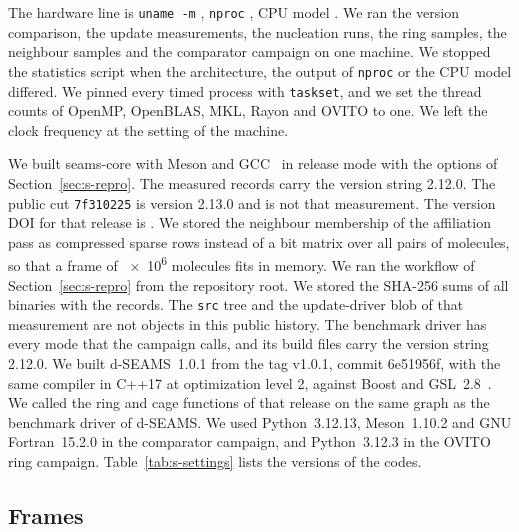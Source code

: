 \documentclass[preprint,12pt]{elsarticle}
\begin{document}
The hardware line is \texttt{uname -m} \texttt{},
\texttt{nproc} , CPU model \texttt{}.
We ran the version comparison, the update measurements, the nucleation
runs, the ring samples, the neighbour samples and the comparator
campaign on one machine.
We stopped the statistics script when the architecture, the output of
\texttt{nproc} or the CPU model differed.
We pinned every timed process with \texttt{taskset}, and we set the
thread counts of OpenMP, OpenBLAS, MKL, Rayon and OVITO to one.
We left the clock frequency at the setting of the machine.

We built seams-core with Meson and GCC~ in release mode with
the options of Section~\ref{sec:s-repro}.
The measured records carry the version string 2.12.0.
The public cut \texttt{7f310225} is version 2.13.0 and is not that measurement.
The version DOI for that release is \DOIPENDING.
We stored the neighbour membership of the affiliation pass as compressed
sparse rows instead of a bit matrix over all pairs of molecules, so that
a frame of \num{e6} molecules fits in memory.
We ran the workflow of Section~\ref{sec:s-repro} from the repository
root.
We stored the SHA-256 sums of all binaries with the records.
The \texttt{src} tree and the update-driver blob of that measurement
are not objects in this public history.
The benchmark driver has every mode that the campaign calls, and its
build files carry the version string 2.12.0.
We built d-SEAMS~1.0.1 from the tag v1.0.1, commit 6e51956f, with the
same compiler in C++17 at optimization level 2, against Boost and
GSL~2.8~\cite{dseams101}.
We called the ring and cage functions of that release on the same graph
as the benchmark driver of d-SEAMS.
We used Python~3.12.13, Meson~1.10.2 and GNU Fortran~15.2.0 in the
comparator campaign, and Python~3.12.3 in the OVITO ring campaign.
Table~\ref{tab:s-settings} lists the versions of the codes.

\subsection{Frames}
\label{sec:s-frames}
\end{document}
